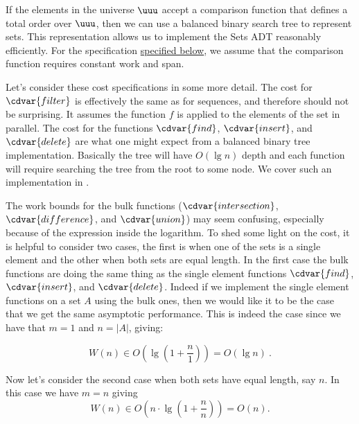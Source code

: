 \begin{gram}
If the elements in the universe $\uuu$ accept a comparison function 
that defines a total order over $\uuu$, then we can use a balanced binary search tree to represent sets.
%
This representation allows us to implement the Sets ADT reasonably efficiently.
%
For the specification \href{cost:sets::trees}{specified below}, we assume that the comparison function requires constant work and span.  
%
\end{gram}

\begin{costspec}
\label{XXcost:sets::trees}

\end{costspec}

\begin{gram}
Let's consider these cost specifications in some more detail.  The
cost for $\cdvar{filter}$ is effectively the same as for sequences, and
therefore should not be surprising.  It assumes the function $f$ is
applied to the elements of the set in parallel.  The cost for the
functions $\cdvar{find}$, $\cdvar{insert}$, and $\cdvar{delete}$ are
what one might expect from a balanced binary tree implementation.
Basically the tree will have $O(\lg n)$ depth and each function will
require searching the tree from the root to some node.  We cover
such an implementation in .
\end{gram}




\begin{gram}
  The work bounds for the bulk functions ($\cdvar{intersection}$,
  $\cdvar{difference}$, and $\cdvar{union}$) may seem confusing,
  especially because of the expression inside the logarithm.  To shed
  some light on the cost, it is helpful to consider two cases, the
  first is when one of the sets is a single element and the other when
  both sets are equal length.  In the first case the bulk functions
  are doing the same thing as the single element functions
  $\cdvar{find}$, $\cdvar{insert}$, and $\cdvar{delete}$.  Indeed if
  we implement the single element functions on a set $A$ using the
  bulk ones, then we would like it to be
  the case that we get the same asymptotic performance.  This is
  indeed the case since we have that $m = 1$ and $n = |A|$, giving:

\[W(n) \in O\left(\lg \left(1 + \frac{n}{1}\right)\right) 
= O(\lg n)~.\]

Now let's consider the second case when both sets have equal length,
say $n$.   In this case we have $m = n$ giving
\[
W(n) \in O\left(n \cdot \lg \left(1+\frac{n}{n}\right)\right) = O(n).
\]
\end{gram}

